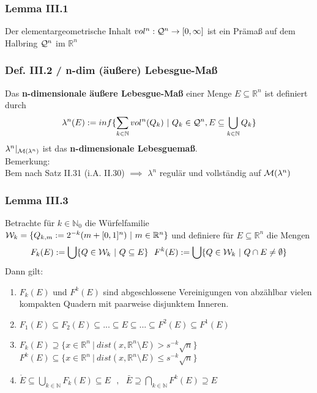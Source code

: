
\begin{frame}
\frametitle{Lemma III.1}
Der elementargeometrische Inhalt $vol^n: \mathcal{Q}^n \to [0, \infty]$ ist ein Prämaß auf dem Halbring $\mathcal{Q}^n$ im $\mathbb{R}^n$
\end{frame}


\begin{frame}
\frametitle{Def. III.2 / n-dim (äußere) Lebesgue-Maß }
Das \textbf{n-dimensionale äußere Lebesgue-Maß} einer Menge $E \subseteq \mathbb{R}^n$ ist definiert durch
    \begin{align*}
      \lambda^n(E) := inf\{\sum\limits_{k \in \mathbb{N}} vol^n(Q_k) \ | \ Q_k \in \mathcal{Q}^n, E \subseteq \bigcup\limits_{k \in \mathbb{N}} Q_k\}
    \end{align*}
    $\lambda^n|_{\mathcal{M}(\lambda^n)}$ ist das \textbf{n-dimensionale Lebesguemaß}.\\
    \medskip
Bemerkung:\\
Bem nach Satz II.31 (i.A. II.30) $\implies$ $\lambda^n$ regulär und vollständig auf $\mathcal{M}(\lambda^n)$
\end{frame}


\begin{frame}
\frametitle{Lemma III.3}
Betrachte für $k \in \mathbb{N}_0$ die Würfelfamilie $\mathcal{W}_k = \{Q_{k,m} := 2^{-k}(m + [0,1]^n) \ | \ m \in \mathbb{R}^n\}$ und definiere für $E \subseteq \mathbb{R}^n$ die Mengen
    \begin{align*}
    F_k(E) := \bigcup \{Q \in \mathcal{W}_k \ | \ Q \subseteq E\} \ \
    F^k(E) := \bigcup \{Q \in \mathcal{W}_k \ | \ Q \cap E \neq \emptyset\}
    \end{align*}
    Dann gilt:
    \begin{enumerate}[label=\roman*)]
      \item $F_k(E)$ und $F^k(E)$ sind abgeschlossene Vereinigungen von abzählbar vielen kompakten Quadern mit paarweise disjunktem Inneren.
      \item $F_1(E) \subseteq F_2(E) \subseteq ... \subseteq E \subseteq ... \subseteq F^2(E) \subseteq F^1(E)$ 
      \item $F_k(E) \supseteq \{x \in \mathbb{R}^n \ | \ dist(x, \mathbb{R}^n \setminus E) > s^{-k} \sqrt{n}\}$\\
      $F^k(E) \subseteq \{x \in \mathbb{R}^n \ | \ dist(x, \mathbb{R}^n \setminus E) \leq s^{-k} \sqrt{n}\}$
      \item $\mathring{E} \subseteq \bigcup\limits_{k \in \mathbb{N}} F_k(E) \subseteq E \ \ \ , \ \ \ \bar{E} \supseteq \bigcap\limits_{k \in \mathbb{N}} F^k(E) \supseteq E$
    \end{enumerate}
\end{frame}

